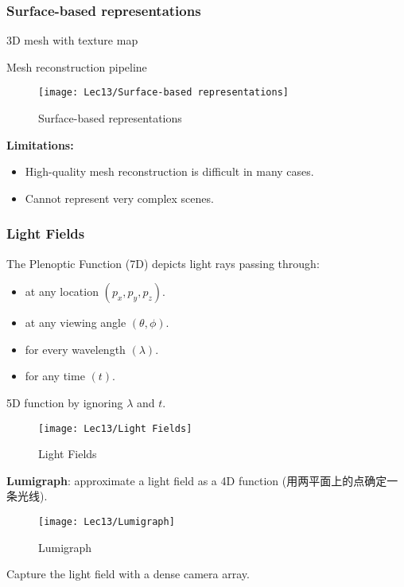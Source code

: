 \subsubsection{Surface-based representations}
3D mesh with texture map

Mesh reconstruction pipeline

\begin{figure}[H]
    \centering
    \texttt{[image: Lec13/Surface-based representations]}
    \caption{Surface-based representations}
\end{figure}

\textbf{Limitations:}
\begin{itemize}
    \item High-quality mesh reconstruction is difficult in many cases. 
    \item Cannot represent very complex scenes. 
\end{itemize}

\subsubsection{Light Fields}
The Plenoptic Function (7D) depicts light rays passing through:
\begin{itemize}
    \item at any location $(p_x, p_y, p_z)$. 
    \item at any viewing angle $(\theta, \phi)$. 
    \item for every wavelength $(\lambda)$. 
    \item for any time $(t)$. 
\end{itemize}
5D function by ignoring $\lambda$ and $t$. 

\begin{figure}[H]
    \centering
    \texttt{[image: Lec13/Light Fields]}
    \caption{Light Fields}
\end{figure}

\textbf{Lumigraph}: approximate a light field as a 4D function (用两平面上的点确定一条光线). 

\begin{figure}[H]
    \centering
    \texttt{[image: Lec13/Lumigraph]}
    \caption{Lumigraph}
\end{figure}

Capture the light field with a dense camera array. 


